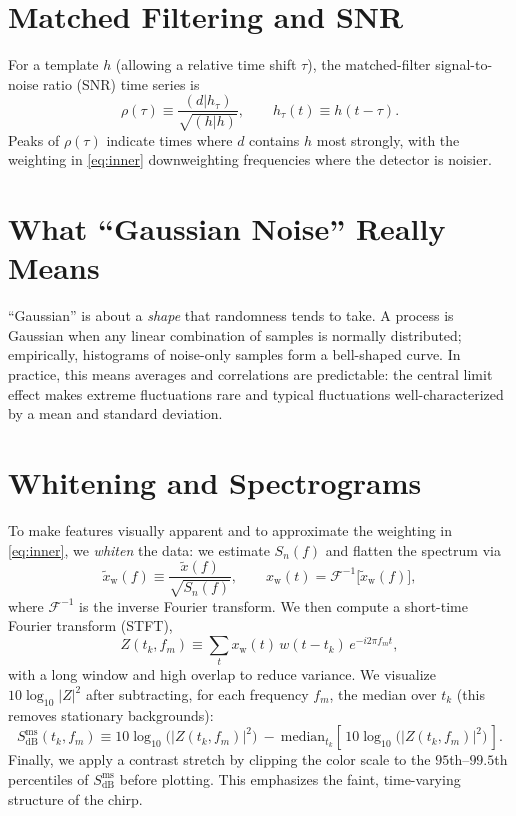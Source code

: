 \documentclass[11pt,a4paper]{article}
\begin{document}
\section{Matched Filtering and SNR}
For a template $h$ (allowing a relative time shift $\tau$), the matched-filter signal-to-noise ratio (SNR) time series is
\begin{equation}
\rho(\tau) \equiv \frac{(d | h_\tau)}{\sqrt{(h|h)}}, \qquad
h_\tau(t) \equiv h(t-\tau). \label{eq:snr}
\end{equation}
Peaks of $\rho(\tau)$ indicate times where $d$ contains $h$ most strongly, with the weighting in \eqref{eq:inner} downweighting frequencies where the detector is noisier.

\section{What ``Gaussian Noise'' Really Means}
``Gaussian'' is about a \emph{shape} that randomness tends to take. A process is Gaussian when any linear combination of samples is normally distributed; empirically, histograms of noise-only samples form a bell-shaped curve. In practice, this means averages and correlations are predictable: the central limit effect makes extreme fluctuations rare and typical fluctuations well-characterized by a mean and standard deviation.

\section{Whitening and Spectrograms}
To make features visually apparent and to approximate the weighting in \eqref{eq:inner}, we \emph{whiten} the data: we estimate $S_n(f)$ and flatten the spectrum via
\begin{equation}
\tilde x_{\mathrm{w}}(f) \equiv \frac{\tilde x(f)}{\sqrt{S_n(f)}}, \qquad
x_{\mathrm{w}}(t) = \mathcal{F}^{-1}\!\big[\tilde x_{\mathrm{w}}(f)\big], \label{eq:whiten}
\end{equation}
where $\mathcal{F}^{-1}$ is the inverse Fourier transform. We then compute a short-time Fourier transform (STFT),
\begin{equation}
Z(t_k,f_m) \equiv \sum_{t} x_{\mathrm{w}}(t)\,w(t-t_k)\,e^{-i2\pi f_m t}, \label{eq:stft}
\end{equation}
with a long window and high overlap to reduce variance. We visualize $10\log_{10}|Z|^2$ after subtracting, for each frequency $f_m$, the median over $t_k$ (this removes stationary backgrounds):
\begin{equation}
S_{\mathrm{dB}}^{\mathrm{ms}}(t_k,f_m) \equiv 10\log_{10}\!\big(|Z(t_k,f_m)|^2\big)
~ - ~ \mathrm{median}_{t_k}\!\left[\,10\log_{10}\!\big(|Z(t_k,f_m)|^2\big)\,\right]. \label{eq:medsub}
\end{equation}
Finally, we apply a contrast stretch by clipping the color scale to the $95$th--$99.5$th percentiles of $S_{\mathrm{dB}}^{\mathrm{ms}}$ before plotting. This emphasizes the faint, time-varying structure of the chirp.
\end{document}
